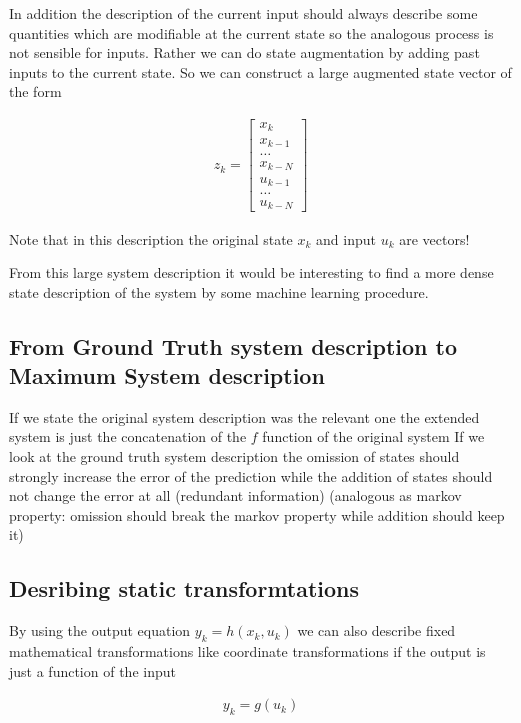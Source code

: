 \documentclass[a4paper, 10pt]{article}
\begin{document}
In addition the description of the current input should always describe some quantities which are modifiable at the current state so the analogous process is not sensible for inputs.
Rather we can do state augmentation by adding past inputs to the current state.
So we can construct a large augmented state vector of the form

\begin{align*}
z_k =
\begin{bmatrix}
x_k \\
x_{k-1} \\
\dots \\
x_{k-N} \\
u_{k-1} \\
\dots \\
u_{k-N}
\end{bmatrix}
\end{align*}

Note that in this description the original state $x_k$ and input $u_k$ are vectors!

From this large system description it would be interesting to find a more dense state description of the system by some machine learning procedure.

\subsection*{From Ground Truth system description to Maximum System description}

If we state the original system description was the relevant one the extended system is just the concatenation of the $f$ function of the original system
If we look at the ground truth system description  the omission of states should strongly increase the error of the prediction while the addition of states should not change the error at all (redundant information) (analogous as markov property: omission should break the markov property while addition should keep it)

\subsection*{Desribing static transformtations}

By using the output equation $y_k=h(x_k,u_k)$ we can also describe fixed mathematical transformations like coordinate transformations if the output is just a function of the input

\begin{align*}
y_k=g(u_k)
\end{align*}

    
\end{document}
